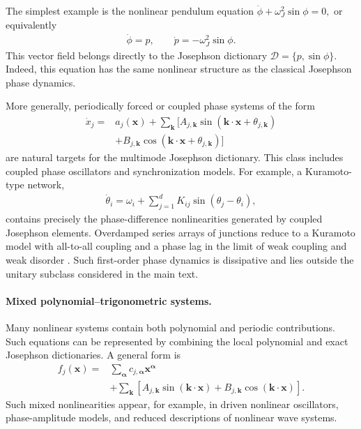 \documentclass[pra,twocolumn,superscriptaddress,nofootinbib,floatfix]{revtex4-2}
\theoremstyle{remark}
\newcommand{\revcolor}{\color{blue}}
\DeclareRobustCommand{\rev}[1]{{\revcolor #1}}
\begin{document}
The simplest example is the nonlinear pendulum equation \(\ddot\phi+\omega_J^2\sin\phi=0,\) or equivalently
\begin{align}
\dot\phi = p,\qquad\dot p =-\omega_J^2\sin\phi.
\end{align}
This vector field belongs directly to the Josephson dictionary \(\mathcal D=\{p,\sin\phi\}.\) Indeed, this equation has the same nonlinear structure as the classical Josephson phase dynamics.

More generally, periodically forced or coupled phase systems of the form
\begin{align}
\dot x_j={}&a_j(\mathbf x)+\sum_{\mathbf k}\Big[A_{j,\mathbf k}\sin(\mathbf k\cdot\mathbf x+\theta_{j,\mathbf k})\nonumber\\
&+B_{j,\mathbf k}\cos(\mathbf k\cdot\mathbf x+\theta_{j,\mathbf k})\Big]
\label{eq:fourier-vector-field}
\end{align}
are natural targets for the multimode Josephson dictionary. This class includes coupled phase oscillators and synchronization models. For example, a Kuramoto-type network,
\begin{align}
\dot\theta_i=\omega_i+\sum_{j=1}^{d}K_{ij}\sin(\theta_j-\theta_i),
\label{eq:kuramoto}
\end{align}
contains precisely the phase-difference nonlinearities generated by coupled Josephson elements. \rev{Overdamped series arrays of junctions reduce to a Kuramoto model with all-to-all coupling and a phase lag in the limit of weak coupling and weak disorder \cite{Wiesenfeld1996JJKuramoto}.} \rev{Such first-order phase dynamics is dissipative and lies outside the unitary subclass considered in the main text.}

\paragraph{Mixed polynomial--trigonometric systems.}
Many nonlinear systems contain both polynomial and periodic contributions. Such equations can be represented by combining the local polynomial and exact Josephson dictionaries. A general form is
\begin{align}
f_j(\mathbf x)={}&\sum_{\boldsymbol{\alpha}}c_{j,\boldsymbol{\alpha}}\mathbf x^{\boldsymbol{\alpha}}\nonumber\\
&+\sum_{\mathbf k}\left[A_{j,\mathbf k}\sin(\mathbf k\cdot\mathbf x)+B_{j,\mathbf k}\cos(\mathbf k\cdot\mathbf x)\right].
\label{eq:mixed-vector-field}
\end{align}
Such mixed nonlinearities appear, for example, in driven nonlinear oscillators, phase-amplitude models, and reduced descriptions of nonlinear wave systems.
\end{document}
